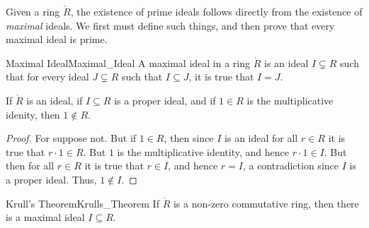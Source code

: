     Given a ring $\ring{R}$, the existence of prime ideals follows directly
    from the existence of \textit{maximal} ideals. We first must define such
    things, and then prove that every maximal ideal is prime.
    \begin{fdefinition}{Maximal Ideal}{Maximal_Ideal}
        A maximal ideal in a ring $\ring{R}$ is an ideal $I\subsetneq{R}$
        such that for every ideal $J\subsetneq{R}$ such that
        $I\subseteq{J}$, it is true that $I=J$.
    \end{fdefinition}
    \begin{theorem}
        \label{thm:Proper_Ideal_Does_Not_Contain_1}%
        If $\ring{R}$ is an ideal, if $I\subseteq{R}$ is a proper ideal, and
        if $1\in{R}$ is the multiplicative idenity, then $1\notin{R}$.
    \end{theorem}
    \begin{proof}
        For suppose not. But if $1\in{R}$, then since $I$ is an ideal for
        all $r\in{R}$ it is true that $r\cdot{1}\in{R}$. But $1$ is the
        multiplicative identity, and hence $r\cdot{1}\in{I}$. But then for
        all $r\in{R}$ it is true that $r\in{I}$, and hence $r=I$, a
        contradiction since $I$ is a proper ideal. Thus, $1\notin{I}$.
    \end{proof}
    \begin{ftheorem}{Krull's Theorem}{Krulls_Theorem}
        If $\ring{R}$ is a non-zero commutative ring, then there is a
        maximal ideal $I\subseteq{R}$.
    \end{ftheorem}
